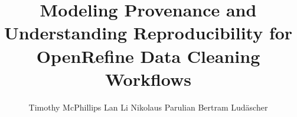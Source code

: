 \documentclass[sigconf,screen,nonacm]{acmart}
\begin{document}
\title[Reproducible Data Cleaning]{Modeling Provenance and Understanding Reproducibility for OpenRefine Data
  Cleaning Workflows}

\author{Timothy McPhillips \qquad Lan Li \qquad Nikolaus Parulian \qquad Bertram Lud\"ascher}
 

\maketitle













%


\end{document}
